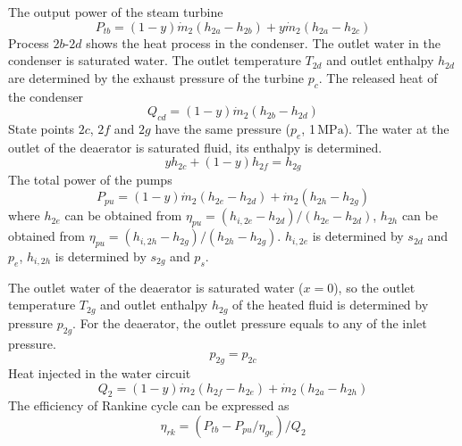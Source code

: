     The output power of the steam turbine
    \begin{equation}
  P_{tb}=\left(1-y\right)\dot{m}_{2}\left(h_{2a}-h_{2b}\right)+y\dot{m}_{2}\left(h_{2a}-h_{2c}\right)
  \end{equation}
  Process $2b$-$2d$ shows the heat process in the condenser. The outlet water in the condenser is saturated water. The outlet temperature $T_{2d}$ and outlet enthalpy $h_{2d}$ are determined by the exhaust pressure of the turbine $p_c$.
  The released heat of the condenser
  \begin{equation}
      Q_{cd} = (1-y)\dot{m}_2 (h_{2b} - h_{2d})
\end{equation}
  State points $2c$, $2f$ and $2g$ have the same pressure ($p_e$, 1$\,\mathrm{MPa}$). The water at the outlet of the deaerator is saturated fluid, its enthalpy is determined.
  \begin{equation}
  y h_{2c} + (1-y) h_{2f} = h_{2g}
\end{equation}
  The total power of the pumps 
\begin{equation}
	P_{pu}=\left(1-y\right)\dot{m}_{2}\left(h_{2e}-h_{2d}\right)+\dot{m}_{2}\left(h_{2h}-h_{2g}\right)
\end{equation}
where $h_{2e}$ can be obtained from $\eta_{pu} = (h_{i,2e}-h_{2d})/(h_{2e}-h_{2d})$, $h_{2h}$ can be obtained from $\eta_{pu} = (h_{i,2h}-h_{2g})/(h_{2h}-h_{2g})$. $h_{i,2e}$ is determined by $s_{2d}$ and $p_e$, $h_{i,2h}$ is determined by $s_{2g}$ and $p_s$.
    
The outlet water of the deaerator is saturated water ($x = 0$), so the outlet temperature $T_{2g}$ and outlet enthalpy $h_{2g}$ of the heated fluid is determined by pressure $p_{2g}$. For the deaerator, the outlet pressure equals to any of the inlet pressure.
\begin{equation}
  p_{2g} = p_{2c}
\end{equation}    
Heat injected in the water circuit
\begin{equation}
	    Q_2=\left(1-y\right)\dot{m}_{2}\left(h_{2f}-h_{2e}\right)+\dot{m}_{2}\left(h_{2a}-h_{2h}\right)
    \end{equation}
The efficiency of Rankine cycle can be expressed as
\begin{equation}
	\eta_{rk}=(P_{tb}-P_{pu}/\eta_{ge})/Q_{2}
\end{equation}

